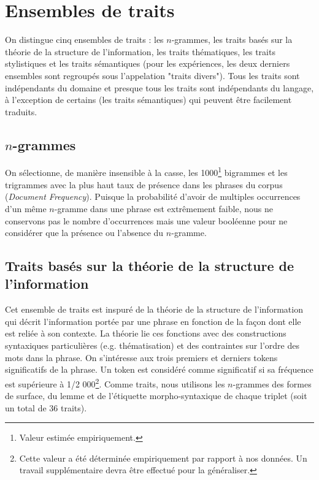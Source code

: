 \section{Ensembles de traits}

On distingue cinq ensembles de traits : les $n$-grammes, les traits basés sur la théorie de la structure de l'information, les traits thématiques, les traits stylistiques et les traits sémantiques (pour les expériences, les deux derniers ensembles sont regroupés sous l'appelation "traits divers"). Tous les traits sont indépendants du domaine et presque tous les traits sont indépendants du langage, à l'exception de certains (les traits sémantiques) qui peuvent être facilement traduits.

\subsection{$n$-grammes}

On sélectionne, de manière insensible à la casse, les 1000\footnote{Valeur estimée empiriquement.} bigrammes et les trigrammes avec la plus haut taux de présence dans les phrases du corpus (\textit{Document Frequency}). Puisque la probabilité d'avoir de multiples occurrences d'un même $n$-gramme dans une phrase est extrêmement faible, nous ne conservons pas le nombre d'occurrences mais une valeur booléenne pour ne considérer que la présence ou l'absence du $n$-gramme.

\subsection{Traits basés sur la théorie de la structure de l'information}

Cet ensemble de traits est inspuré de la théorie de la structure de l'information \cite{kruijff:1996} qui décrit l'information portée par une phrase en fonction de la façon dont elle est reliée à son contexte. La théorie lie ces fonctions avec des constructions syntaxiques particulières (e.g. thématisation) et des contraintes sur l'ordre des mots dans la phrase. On s'intéresse aux trois premiers et derniers tokens significatifs de la phrase. Un token est considéré comme significatif si sa fréquence est supérieure à 1/2 000\footnote{Cette valeur a été déterminée empiriquement par rapport à nos données. Un travail supplémentaire devra être effectué pour la généraliser.}. Comme traits, nous utilisons les $n$-grammes des formes de surface, du lemme et de l'étiquette morpho-syntaxique de chaque triplet (soit un total de 36 traits).

